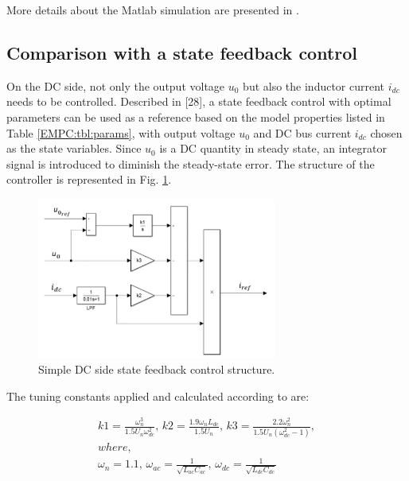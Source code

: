     More details about the Matlab simulation are presented in \cite{neukirchner2019linkedmodel}.

    \subsection{Comparison with a state feedback control}\label{EMPC:sec:Comparison}

    On the DC side, not only the output voltage $u_0$ but also the inductor current $i_{dc}$ needs to be controlled. Described in [28], a state feedback control with optimal parameters can be used as a reference based on the model properties listed in Table \ref{EMPC:tbl:params}, with output voltage $u_0$ and DC bus current $i_{dc}$ chosen as the state variables. Since $u_0$ is a DC quantity in steady state, an integrator signal is introduced to diminish the steady-state error. The structure of the controller is represented in Fig. \ref{EMPC:fig:SFeedbackDC}.

    \begin{figure}[!ht]
        \centering
        \includegraphics[width=0.7\textwidth]{EMPC_PNG_Pics/SFeedbackDC.png}
        \caption{Simple DC side state feedback control structure.}
        \label{EMPC:fig:SFeedbackDC}
    \end{figure}

    The tuning constants applied and calculated according to \cite{godlewska2015predictive} are:

    \begin{equation}
        \begin{array}{l}
            k1=\frac{\omega^3_n}{1.5U_n\omega^2_{dc}},\,k2=\frac{1.9\omega_n L_{dc}}{1.5U_n},\,k3=\frac{2.2\omega^2_n}{1.5U_n(\omega^2_{dc}-1)},\\
            where,\\
            \omega_n=1.1,\,\omega_{ac}=\frac{1}{\sqrt{L_{ac}C_{ac}}},\,\omega_{dc}=\frac{1}{\sqrt{L_{dc}C_{dc}}}
        \end{array}
        \label{EMPC:equ:tuning}
    \end{equation}

